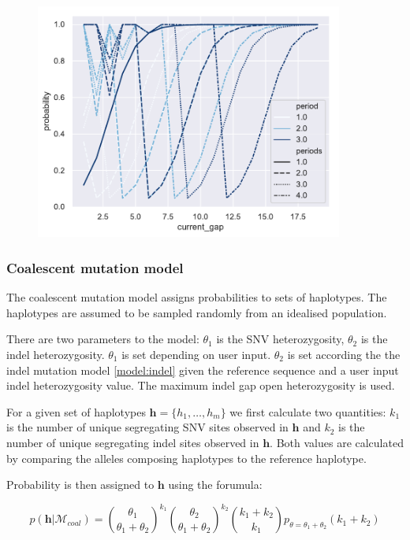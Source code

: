 \documentclass{article}
\begin{document}
\begin{figure}[ht]
	\label{indel-model:extension}
 \centering
 \includegraphics[width=0.9\textwidth]{figures/indel-extension-model}
\end{figure}

\subsubsection{Coalescent mutation model}\label{model:coalescent}

The coalescent mutation model assigns probabilities to sets of haplotypes. The haplotypes are assumed to be sampled randomly from an idealised population.

There are two parameters to the model: $\theta_1$ is the SNV heterozygosity, $\theta_2$ is the indel heterozygosity. $\theta_1$ is set depending on user input. $\theta_2$ is set according the the indel mutation model \ref{model:indel} given the reference sequence and a user input indel heterozygosity value. The maximum indel gap open heterozygosity is used.

For a given set of haplotypes ${\boldsymbol{h} = \{h_1, \dots, h_m\}}$ we first calculate two quantities: $k_1$ is the number of unique segregating SNV sites observed in $\boldsymbol{h}$ and $k_2$ is the number of unique segregating indel sites observed in $\boldsymbol{h}$. Both values are calculated by comparing the alleles composing haplotypes to the reference haplotype. 

Probability is then assigned to $\boldsymbol{h}$ using the forumula:

\begin{equation}
    p(\boldsymbol{h} | \mathcal{M}_{coal}) = \binom{\theta_1}{\theta_1 + \theta_2}^{k_1} \binom{\theta_2}{\theta_1 + \theta_2}^{k_2} \binom{k_1 + k_2}{k_1} p_{\theta = \theta_1 + \theta_2} (k_1 + k_2)
\end{equation}
\end{document}
